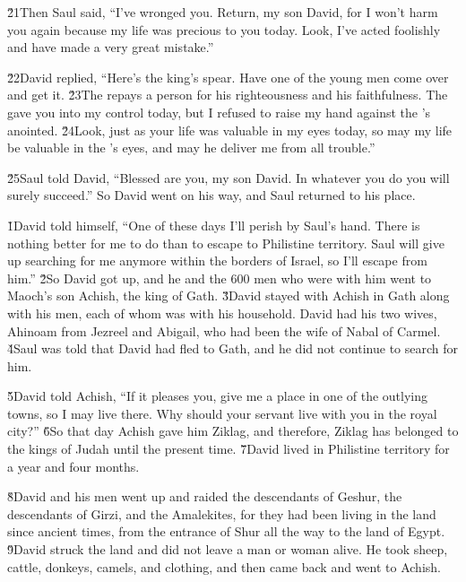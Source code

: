 \v{21}Then Saul said, ``I've wronged you. Return, my son David, for I won't harm you again because my life was precious to you today. Look, I've acted foolishly and have made a very great mistake.''

\v{22}David replied, ``Here's the king's spear. Have one of the young men come over and get it. \v{23}The  repays a person for his righteousness and his faithfulness. The  gave you into my control today, but I refused to raise my hand against the 's anointed. \v{24}Look, just as your life was valuable in my eyes today, so may my life be valuable in the 's eyes, and may he deliver me from all trouble.''

\v{25}Saul told David, ``Blessed are you, my son David. In whatever you do you will surely succeed.'' So David went on his way, and Saul returned to his place.

\v{1}David told himself, ``One of these days I'll perish by Saul's hand. There is nothing better for me to do than to escape to Philistine territory. Saul will give up searching for me anymore within the borders of Israel, so I'll escape from him.'' \v{2}So David got up, and he and the 600 men who were with him went to Maoch's son Achish, the king of Gath. \v{3}David stayed with Achish in Gath along with his men, each of whom was with his household. David had his two wives, Ahinoam from Jezreel and Abigail, who had been the wife of Nabal of Carmel. \v{4}Saul was told that David had fled to Gath, and he did not continue to search for him.

\v{5}David told Achish, ``If it pleases you, give me a place in one of the outlying towns, so I may live there. Why should your servant live with you in the royal city?'' \v{6}So that day Achish gave him Ziklag, and therefore, Ziklag has belonged to the kings of Judah until the present time. \v{7}David lived in Philistine territory for a year and four months.

\v{8}David and his men went up and raided the descendants of Geshur, the descendants of Girzi, and the Amalekites, for they had been living in the land since ancient times, from the entrance of Shur all the way to the land of Egypt. \v{9}David struck the land and did not leave a man or woman alive. He took sheep, cattle, donkeys, camels, and clothing, and then came back and went to Achish.

